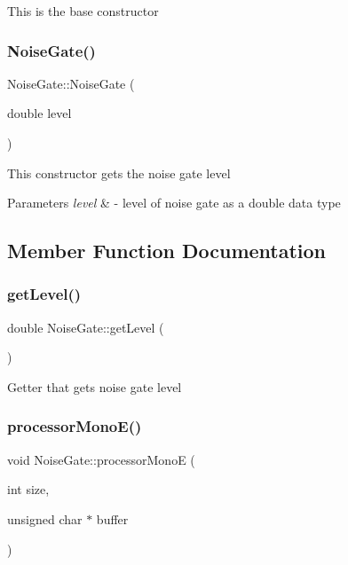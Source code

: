 This is the base constructor \mbox{\label{classNoiseGate_a595f0fbe191ba5eaed8b52c8f2c5049f}} 
\subsubsection{\texorpdfstring{Noise\+Gate()}{NoiseGate()}\hspace{0.1cm}{\footnotesize\ttfamily [2/2]}}
{\footnotesize\ttfamily Noise\+Gate\+::\+Noise\+Gate (\begin{DoxyParamCaption}\item[{double}]{level }\end{DoxyParamCaption})}

This constructor gets the noise gate level 
\begin{DoxyParams}{Parameters}
{\em level} & -\/ level of noise gate as a double data type \\
\hline
\end{DoxyParams}


\subsection{Member Function Documentation}
\mbox{\label{classNoiseGate_a48958705ac7b9de4cfe5ae284b8fb4f6}} 
\subsubsection{\texorpdfstring{get\+Level()}{getLevel()}}
{\footnotesize\ttfamily double Noise\+Gate\+::get\+Level (\begin{DoxyParamCaption}{ }\end{DoxyParamCaption})}

Getter that gets noise gate level \mbox{\label{classNoiseGate_ab2965cbd79e9bb7cd5d972967d3da678}} 
\subsubsection{\texorpdfstring{processor\+Mono\+E()}{processorMonoE()}}
{\footnotesize\ttfamily void Noise\+Gate\+::processor\+MonoE (\begin{DoxyParamCaption}\item[{int}]{size,  }\item[{unsigned char $\ast$}]{buffer }\end{DoxyParamCaption})\hspace{0.3cm}{\ttfamily [virtual]}}

